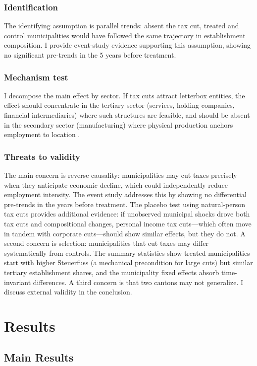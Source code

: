 \documentclass[12pt]{article}
\begin{document}
\subsubsection*{Identification} The identifying assumption is parallel trends: absent the tax cut, treated and control municipalities would have followed the same trajectory in establishment composition. I provide event-study evidence supporting this assumption, showing no significant pre-trends in the 5 years before treatment.

\subsubsection*{Mechanism test} I decompose the main effect by sector. If tax cuts attract letterbox entities, the effect should concentrate in the tertiary sector (services, holding companies, financial intermediaries) where such structures are feasible, and should be absent in the secondary sector (manufacturing) where physical production anchors employment to location \citep{giroud2019state}.

\subsubsection*{Threats to validity} The main concern is reverse causality: municipalities may cut taxes precisely when they anticipate economic decline, which could independently reduce employment intensity. The event study addresses this by showing no differential pre-trends in the years before treatment. The placebo test using natural-person tax cuts provides additional evidence: if unobserved municipal shocks drove both tax cuts and compositional changes, personal income tax cuts---which often move in tandem with corporate cuts---should show similar effects, but they do not. A second concern is selection: municipalities that cut taxes may differ systematically from controls. The summary statistics show treated municipalities start with higher Steuerfuss (a mechanical precondition for large cuts) but similar tertiary establishment shares, and the municipality fixed effects absorb time-invariant differences. A third concern is that two cantons may not generalize. I discuss external validity in the conclusion.

\section{Results}

\subsection{Main Results}
\end{document}
